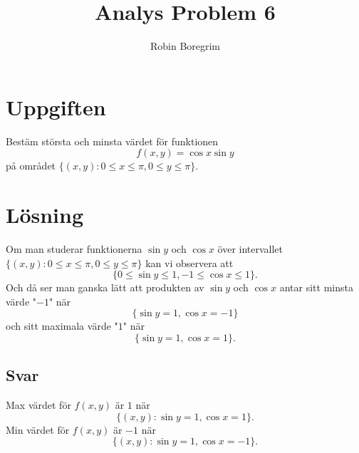 \documentclass[11pt]{article}
\begin{document}
\title{Analys Problem 6}
\author{Robin Boregrim}
\maketitle
\renewcommand{\contentsname}{Innehållsförteckning}
\tableofcontents
\newpage
\section{Uppgiften}
Bestäm största och minsta värdet för funktionen $$f(x,y) = \cos x \sin y$$
på området $\{ (x,y): 0\leq x \leq \pi, 0 \leq y \leq \pi \}$.
\section{Lösning}
Om man studerar funktionerna $\sin y$ och $\cos x$ över intervallet $\{ (x,y): 0\leq x \leq \pi, 0 \leq y \leq \pi \}$ kan vi observera att 
$$\{0 \leq \sin y \leq 1, -1 \leq \cos x \leq 1 \}.$$
Och då ser man ganska lätt att produkten av $\sin y$ och $\cos x$ antar sitt minsta värde "$-1$" när $$\{\sin y = 1, \cos x =-1 \}$$ och sitt maximala värde "$1$" när $$\{\sin y = 1, \cos x =1 \}.$$
\subsection{Svar}
Max värdet för $f(x,y)$ är $1$ när $$\{(x,y):\sin y = 1, \cos x =1 \}.$$
Min värdet för $f(x,y)$ är $-1$ när $$\{(x,y):\sin y = 1, \cos x =-1 \}.$$
\end{document}
